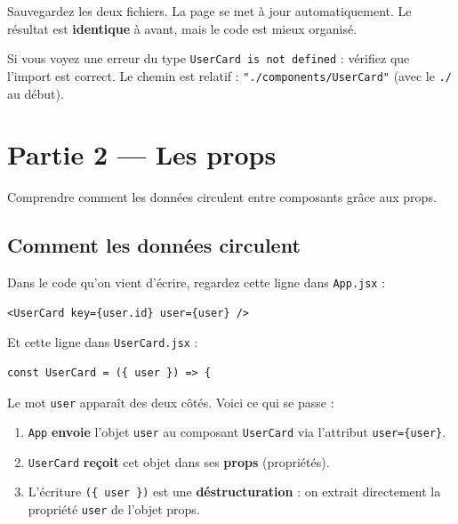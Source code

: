 \documentclass[11pt,a4paper]{article}
\begin{document}
Sauvegardez les deux fichiers. La page se met à jour automatiquement. Le résultat est \textbf{identique} à avant, mais le code est mieux organisé.

\begin{attentionbox}[Vérification]
Si vous voyez une erreur du type \texttt{UserCard is not defined} : vérifiez que l'import est correct. Le chemin est relatif : \texttt{"./components/UserCard"} (avec le \texttt{./} au début).
\end{attentionbox}

\section{Partie 2 --- Les props}
\label{sec:props}

\begin{objectifbox}
Comprendre comment les données circulent entre composants grâce aux props.
\end{objectifbox}

\subsection{Comment les données circulent}

Dans le code qu'on vient d'écrire, regardez cette ligne dans \texttt{App.jsx} :

\begin{lstlisting}
<UserCard key={user.id} user={user} />
\end{lstlisting}

Et cette ligne dans \texttt{UserCard.jsx} :

\begin{lstlisting}
const UserCard = ({ user }) => {
\end{lstlisting}

Le mot \texttt{user} apparaît des deux côtés. Voici ce qui se passe :

\begin{enumerate}[nosep]
    \item \texttt{App} \textbf{envoie} l'objet \texttt{user} au composant \texttt{UserCard} via l'attribut \texttt{user=\{user\}}.
    \item \texttt{UserCard} \textbf{reçoit} cet objet dans ses \textbf{props} (propriétés).
    \item L'écriture \texttt{(\{ user \})} est une \textbf{déstructuration} : on extrait directement la propriété \texttt{user} de l'objet props.
\end{enumerate}
\end{document}

